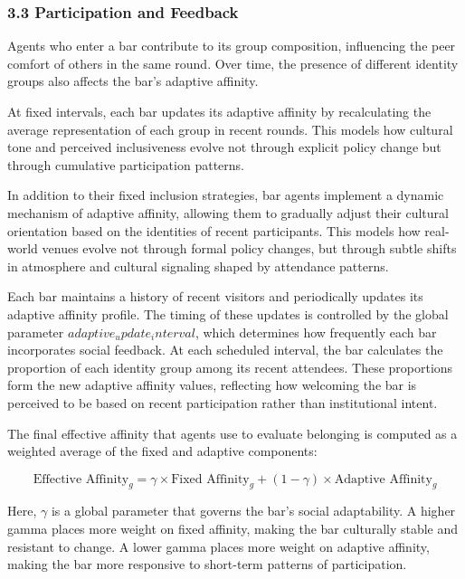 \documentclass{article}
\begin{document}
\subsubsection*{3.3 Participation and Feedback}

Agents who enter a bar contribute to its group composition, influencing the peer comfort of others in the same round. Over time, the presence of different identity groups also affects the bar’s adaptive affinity.

At fixed intervals, each bar updates its adaptive affinity by recalculating the average representation of each group in recent rounds. This models how cultural tone and perceived inclusiveness evolve not through explicit policy change but through cumulative participation patterns.


In addition to their fixed inclusion strategies, bar agents implement a dynamic mechanism of adaptive affinity, allowing them to gradually adjust their cultural orientation based on the identities of recent participants. This models how real-world venues evolve not through formal policy changes, but through subtle shifts in atmosphere and cultural signaling shaped by attendance patterns.

Each bar maintains a history of recent visitors and periodically updates its adaptive affinity profile. The timing of these updates is controlled by the global parameter $adaptive_update_interval$, which determines how frequently each bar incorporates social feedback. At each scheduled interval, the bar calculates the proportion of each identity group among its recent attendees. These proportions form the new adaptive affinity values, reflecting how welcoming the bar is perceived to be based on recent participation rather than institutional intent.



The final effective affinity that agents use to evaluate belonging is computed as a weighted average of the fixed and adaptive components:

\[
\text{Effective Affinity}_g = \gamma \times \text{Fixed Affinity}_g + (1 - \gamma) \times \text{Adaptive Affinity}_g
\]


Here, $\gamma$ is a global parameter that governs the bar’s social adaptability. A higher gamma places more weight on fixed affinity, making the bar culturally stable and resistant to change. A lower gamma places more weight on adaptive affinity, making the bar more responsive to short-term patterns of participation.
\end{document}
